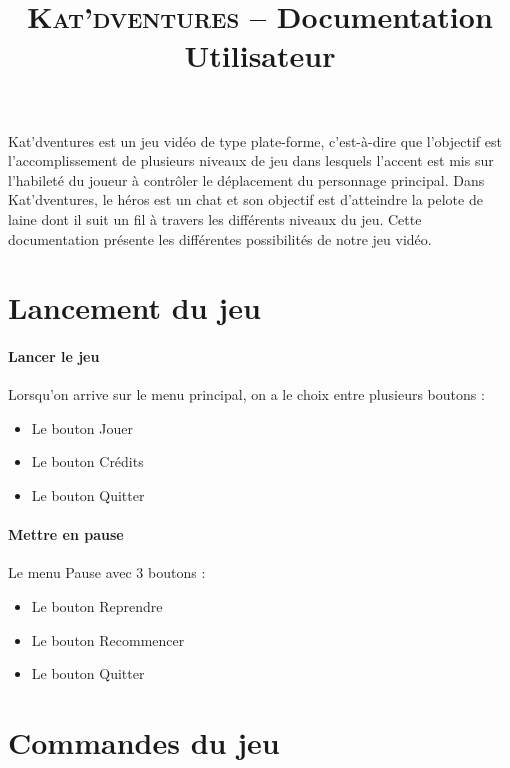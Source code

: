 \documentclass[a4paper,11pt]{article}
\title{ \textsc{Kat'dventures} -- Documentation Utilisateur}
\date{}                    %
\begin{document}
          

\maketitle                 %
\thispagestyle{empty}      %


Kat’dventures est un jeu vidéo de type plate-forme, c’est-à-dire que l’objectif est l’accomplissement de plusieurs niveaux de jeu dans lesquels l'accent est mis sur l'habileté du joueur à contrôler le déplacement du personnage principal. Dans Kat’dventures, le héros est un chat et son objectif est d’atteindre la pelote de laine dont il suit un fil à travers les différents niveaux du jeu.
Cette documentation présente les différentes possibilités de notre jeu vidéo.

\section{Lancement du jeu}
\paragraph{Lancer le jeu} 	 Lorsqu'on arrive sur le menu principal, on a le choix entre plusieurs boutons :

\begin{itemize}
\item Le bouton Jouer
\item Le bouton Crédits
\item Le bouton Quitter
\end{itemize} 

\paragraph{Mettre en pause}  Le menu Pause  avec 3 boutons :

\begin{itemize}
\item Le bouton Reprendre
\item Le bouton Recommencer
\item Le bouton Quitter
\end{itemize} 


\section{Commandes du jeu}
\end{document}
